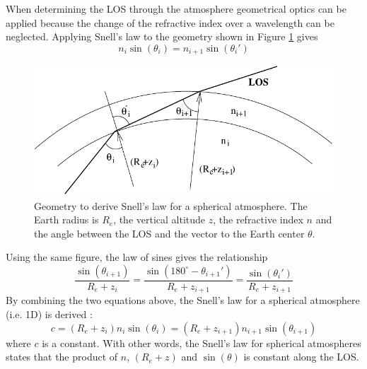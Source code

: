    When determining the LOS through the atmosphere geometrical optics 
   can be applied because the change of the refractive index over a
   wavelength can be neglected. Applying Snell's law to the geometry 
   shown in Figure \ref{fig:los:snell} gives
   \begin{equation}
     n_i \sin (\theta_i) = n_{i+1} \sin (\theta_i')
   \end{equation}
   \begin{figure}
    \begin{center}
      \includegraphics*{Figs/snell}
      \caption{Geometry to derive Snell's law for a spherical atmosphere. 
               The Earth radius is $R_e$, the vertical
               altitude $z$, the refractive index $n$ and the angle
               between the LOS and the vector to the Earth center $\theta$.}
      \label{fig:los:snell} 
    \end{center} 
  \end{figure}
  Using the same figure, the law of sines gives the relationship
  \begin{equation}
    \frac{\sin(\theta_{i+1})}{R_e+z_i} = 
    \frac{\sin(180^\circ-\theta_{i+1}')}{R_e+z_{i+1}} =
    \frac{\sin(\theta_i')}{R_e+z_{i+1}} 
  \end{equation}
  By combining the two equations above, the Snell's law for a spherical
  atmosphere (i.e. 1D) is derived \citep[e.g.][]{kyle:91,balluch:97}:
  \begin{equation}
    c = (R_e+z_i) n_i \sin(\theta_i) = (R_e+z_{i+1}) n_{i+1}\sin(\theta_{i+1}) 
   \label{eq:los:snellspherical}
  \end{equation}
  where $c$ is a constant. With other words, the Snell's law for spherical
  atmospheres states that the product of $n$, $(R_e+z)$ and $\sin(\theta)$ is
  constant along the LOS.

